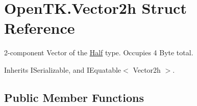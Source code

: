 \hypertarget{struct_open_t_k_1_1_vector2h}{\section{Open\-T\-K.\-Vector2h Struct Reference}
\label{struct_open_t_k_1_1_vector2h}
}


2-\/component Vector of the \hyperlink{struct_open_t_k_1_1_half}{Half} type. Occupies 4 Byte total. 




Inherits I\-Serializable, and I\-Equatable$<$ Vector2h $>$.

\subsection*{Public Member Functions}
